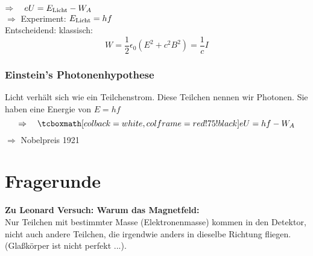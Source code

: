 \\
$ \Rightarrow \quad e U = E_{\textrm{Licht}} - W_A $\\[5pt]
$ \Rightarrow $ Experiment: $ E_{\textrm{Licht}} = h f $\\[5pt]
Entscheidend: klassisch:
\begin{equation*}
W = \frac{1}{2} \epsilon_0 (E^2 + c^2 B^2) = \frac{1}{c} I
\end{equation*}

\subsubsection{Einstein's Photonenhypothese}

Licht verhält sich wie ein Teilchenstrom. Diese Teilchen nennen wir Photonen. Sie haben eine Energie von $ E = h f $
\begin{equation*}
\Rightarrow \quad \rmbox{e U = h f - W_A}
\end{equation*}
$ \Rightarrow $ Nobelpreis 1921

\section*{Fragerunde}


\textbf{Zu Leonard Versuch: Warum das Magnetfeld:}\\
Nur Teilchen mit bestimmter Masse (Elektronenmasse) kommen in den Detektor, nicht auch andere Teilchen, die irgendwie anders in dieselbe Richtung fliegen. (Glaßkörper ist nicht perfekt ...).\\[5pt]


